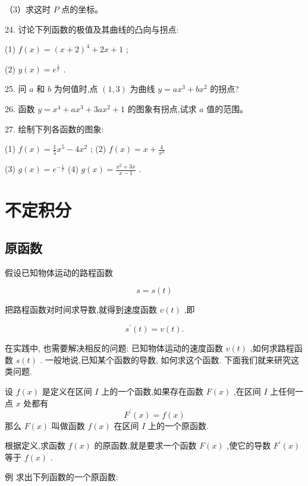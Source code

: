 \documentclass[lang=cn,newtx,10pt,scheme=chinese]{elegantbook}
\begin{document}
（3）求这时 \(P\) 点的坐标。

24. 讨论下列函数的极值及其曲线的凸向与拐点:

(1) \(f\left( x\right) = {\left( x + 2\right) }^{4} + {2x} + 1\) ;

(2) \(y\left( x\right) = {e}^{\frac{1}{x}}\) .

25. 问 \(a\) 和 \(b\) 为何值时,点 \(\left( {1,3}\right)\) 为曲线 \(y = a{x}^{3} + b{x}^{2}\) 的拐点?

26. 函数 \(y = {x}^{4} + a{x}^{3} + {3a}{x}^{2} + 1\) 的图象有拐点,试求 \(a\) 值的范围。

27. 绘制下列各函数的图象:

(1) \(f\left( x\right) = \frac{1}{5}{x}^{5} - 4{x}^{2}\) ; (2) \(f\left( x\right) = x + \frac{4}{{x}^{2}}\)

(3) \(g\left( x\right) = {e}^{-\frac{1}{x}}\) (4) \(g\left( x\right) = \frac{{x}^{2} + {3x}}{x - 1}\) .

\chapter{不定积分}

\section{原函数}

假设已知物体运动的路程函数

\[
s = s\left( t\right)
\]

把路程函数对时间求导数,就得到速度函数 \(v\left( t\right)\) ,即

\[
{s}^{\prime }\left( t\right) = v\left( t\right) \text{.}
\]

在实践中, 也需要解决相反的问题: 已知物体运动的速度函数 \(v\left( t\right)\) ,如何求路程函数 \(s\left( t\right)\) . 一般地说,已知某个函数的导数, 如何求这个函数. 下面我们就来研究这类问题.
\begin{definition}[原函数]
设 \(f\left( x\right)\) 是定义在区间 \(I\) 上的一个函数,如果存在函数 \(F\left( x\right)\) ,在区间 \(I\) 上任何一点 \(x\) 处都有
\[
{F}^{\prime }\left( x\right) = f\left( x\right)
\]
那么 \(F\left( x\right)\) 叫做函数 \(f\left( x\right)\) 在区间 \(I\) 上的一个原函数.
\end{definition}

根据定义,求函数 \(f\left( x\right)\) 的原函数,就是要求一个函数 \(F\left( x\right)\) ,使它的导数 \({F}^{\prime }\left( x\right)\) 等于 \(f\left( x\right)\) .

例 求出下列函数的一个原函数:
\end{document}
